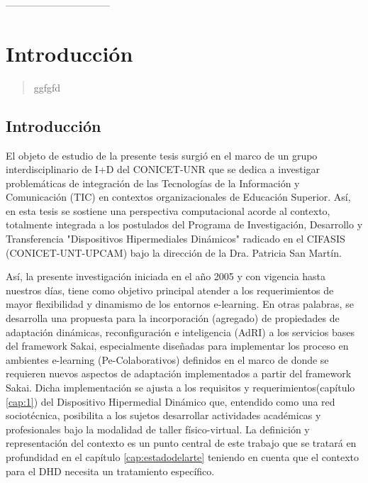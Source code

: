--------------------------------
\parskip=0.6cm

\chapter{Introducción}\label{cap:Introduccion} 


\begin{abstract}
ggfgfd

\end{abstract}


\section{Introducción}

El objeto de estudio de la presente tesis surgió en el marco de un grupo interdisciplinario de I+D del CONICET-UNR que se dedica a investigar problemáticas de integración de las Tecnologías de la Información y Comunicación (TIC) en contextos organizacionales de Educación Superior. Así, en esta tesis se sostiene una perspectiva computacional acorde al contexto, totalmente integrada a los postulados del Programa de Investigación, Desarrollo y Transferencia "Dispositivos Hipermediales Dinámicos" radicado en el CIFASIS (CONICET-UNT-UPCAM) bajo la dirección de la Dra. Patricia San Martín.

Así, la presente investigación iniciada en el año 2005 y con vigencia hasta nuestros días, tiene como objetivo principal atender a los requerimientos de mayor flexibilidad y dinamismo de los entornos e-learning. En otras palabras, se desarrolla una propuesta para la incorporación (agregado) de propiedades de adaptación dinámicas, reconfiguración e inteligencia (AdRI) \label{AdRI} a los servicios bases del framework Sakai,
especialmente diseñadas para implementar los proceso en ambientes e-learning (Pe-Colaborativos) definidos en el marco de \cite{cacic2007.9} donde se requieren nuevos aspectos de adaptación \cite{librounq} implementados a partir del framework Sakai. Dicha
implementación se ajusta a los requisitos y requerimientos(capítulo \ref{cap:1}) del Dispositivo Hipermedial Dinámico que, entendido como una red sociotécnica, posibilita a los sujetos desarrollar actividades académicas y profesionales bajo la modalidad de taller físico-virtual. 
La definición y representación del
contexto es un punto central de este trabajo que se tratará en profundidad en el
capítulo \ref{cap:estadodelarte} teniendo en cuenta que el contexto para el DHD necesita un
tratamiento específico.

